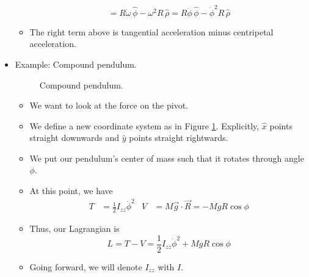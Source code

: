 \documentclass[../notes.tex]{subfiles}
\begin{document}
\begin{itemize}
\begin{itemize}
\begin{equation*}
            = R\dot{\omega}\,\hat{\phi}-\omega^2R\,\hat{\rho}
            = R\ddot{\phi}\,\hat{\phi}-\dot{\phi}^2R\,\hat{\rho}
        \end{equation*}
        \item The right term above is tangential acceleration minus centripetal acceleration.
    \end{itemize}
    \item Example: Compound pendulum.
    \begin{figure}[H]
        \centering
        \caption{Compound pendulum.}
        \label{fig:compoundPendulum}
    \end{figure}
    \begin{itemize}
        \item We want to look at the force on the pivot.
        \item We define a new coordinate system as in Figure \ref{fig:compoundPendulum}. Explicitly, $\hat{x}$ points straight downwards and $\hat{y}$ points straight rightwards.
        \item We put our pendulum's center of mass such that it rotates through angle $\phi$.
        \item At this point, we have
        \begin{align*}
            T &= \frac{1}{2}I_{zz}\dot{\phi}^2&
            V &= M\vec{g}\cdot\vec{R} = -MgR\cos\phi
        \end{align*}
        \item Thus, our Lagrangian is
        \begin{equation*}
            L = T-V = \frac{1}{2}I_{zz}\dot{\phi}^2+MgR\cos\phi
        \end{equation*}
        \item Going forward, we will denote $I_{zz}$ with $I$.

\end{itemize}
\end{itemize}
\end{document}

